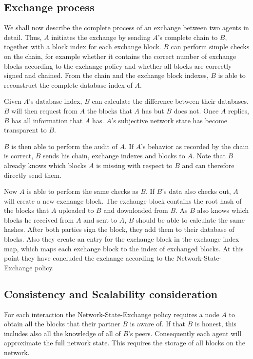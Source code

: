 \subsection{Exchange process}
We shall now describe the complete process of an exchange between two agents in detail. Thus, $A$ 
initiates the exchange by sending $A$'s complete chain to $B$, together with a block index for each 
exchange block.
$B$ can perform simple checks on the chain, for example whether it contains the correct number of exchange blocks
according to the exchange policy and whether all blocks are correctly signed and chained. From the 
chain and the exchange block indexes, $B$ is able to reconstruct the complete database index of $A$.

Given $A$'s database index, $B$ can calculate the difference between their databases. $B$ will 
then request from $A$ the blocks that $A$ has but $B$ does not. Once $A$ replies, $B$ has all 
information that $A$ has. $A$'s subjective network state has become transparent to $B$. 

$B$ is then able to perform the audit of $A$. If $A$'s behavior as recorded by the chain is correct, 
$B$ sends his chain, exchange
indexes and blocks to $A$. Note that $B$ already knows which blocks $A$ is missing with respect to 
$B$ and can therefore directly send them. 

Now $A$ is able to perform the same checks as $B$. If $B$'s data also checks out, $A$ will create 
a new exchange block. The exchange block contains the root hash of the blocks that $A$ uploaded to $B$ 
and downloaded from $B$. As $B$ also knows which blocks he received from $A$ and sent to $A$, $B$ should
be able to calculate the same hashes. After both parties sign the block, they add them to their 
database of blocks. Also they create an entry for the exchange block in the exchange index map, which 
maps each exchange block to the index of exchanged blocks. At this point they have concluded the 
exchange according to the Network-State-Exchange policy.

\subsection{Consistency and Scalability consideration}
For each interaction the Network-State-Exchange policy requires a node $A$ to obtain all the blocks that
their partner $B$ is aware of. If that $B$ is honest, this includes also all the knowledge of all of
$B$'s peers. Consequently each agent will approximate the full network state. This requires the 
storage of all blocks on the network. 

